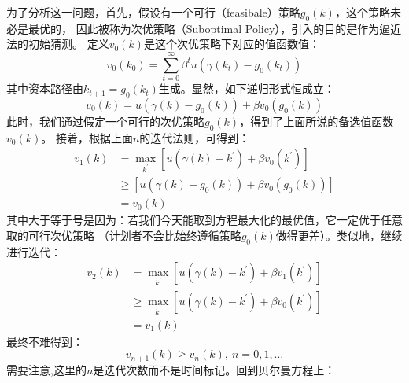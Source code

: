 为了分析这一问题，首先，假设有一个可行（feasibale）策略$g_0\left(k\right)$，这个策略未必是最优的，
因此被称为次优策略（Suboptimal Policy），引入的目的是作为逼近法的初始猜测。
定义$v_0\left(k\right)$是这个次优策略下对应的值函数值：
\begin{equation*}
    v_0\left(k_0\right) = \sum_{t=0}^{\infty} \beta^t u\left(\gamma\left(k_t\right)-g_0\left(k_t\right)\right)
\end{equation*}
其中资本路径由$k_{t+1}=g_0\left(k_t\right)$生成。显然，如下递归形式恒成立：
\begin{equation*}
    v_0\left(k\right) = u\left(\gamma\left(k\right)-g_0\left(k\right)\right) + \beta v_0\left(g_0\left(k\right)\right)
\end{equation*}
此时，我们通过假定一个可行的次优策略$g_0\left(k\right)$，得到了上面所说的备选值函数$v_0\left(k\right)$。
接着，根据上面$n$的迭代法则，可得到：
\begin{equation*}
    \begin{aligned}
        v_1\left(k\right) &= \max _{k^{\prime}}\left[u\left(\gamma\left(k\right)-k^{\prime}\right) 
            + \beta v_0\left(k^{\prime}\right)\right] \\
        &\geq \left[u\left(\gamma\left(k\right)-g_0\left(k\right)\right) 
            + \beta v_0\left(g_0\left(k\right)\right)\right] \\
        &= v_0\left(k\right)   
    \end{aligned}
\end{equation*}
其中大于等于号是因为：若我们今天能取到方程最大化的最优值，它一定优于任意取的可行次优策略
（计划者不会比始终遵循策略$g_0(k)$做得更差）。类似地，继续进行迭代：
\begin{equation*}
    \begin{aligned}
        v_2\left(k\right) &= \max _{k^{\prime}}\left[u\left(\gamma\left(k\right)-k^{\prime}\right) 
            + \beta v_1\left(k^{\prime}\right)\right] \\
        &\geq \max _{k^{\prime}}\left[u\left(\gamma\left(k\right)-k^{\prime}\right) 
            + \beta v_0\left(k^{\prime}\right)\right] \\
        &= v_1\left(k\right)   
    \end{aligned}
\end{equation*}
最终不难得到：
\begin{equation*}
    v_{n+1}\left(k\right) \geq v_{n}\left(k\right),~ n=0,1,\dots
\end{equation*}
需要注意,这里的$n$是迭代次数而不是时间标记。回到贝尔曼方程上：
